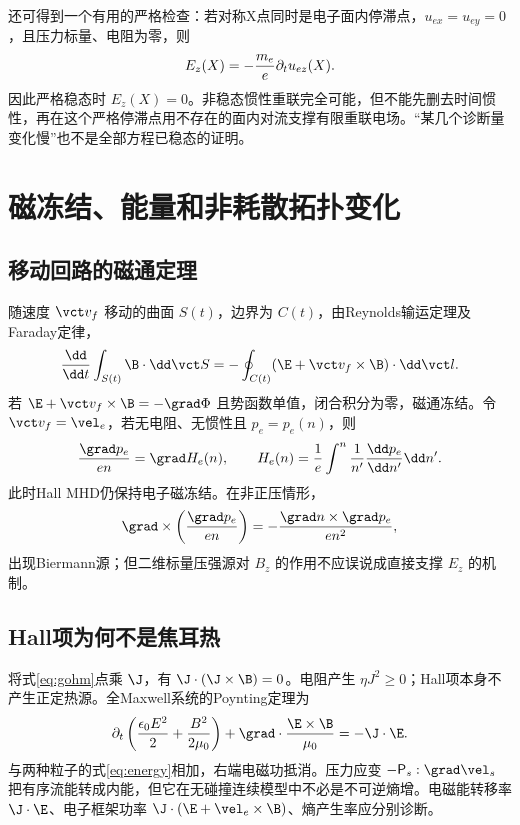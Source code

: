 还可得到一个有用的严格检查：若对称X点同时是电子面内停滞点，$u_{ex}=u_{ey}=0$，且压力标量、电阻为零，则
\begin{equation}E_z(X)=-{m_e\over e}\partial_tu_{ez}(X).
\end{equation}
因此严格稳态时 $E_z(X)=0$。非稳态惯性重联完全可能，但不能先删去时间惯性，再在这个严格停滞点用不存在的面内对流支撑有限重联电场。“某几个诊断量变化慢”也不是全部方程已稳态的证明。

\section{磁冻结、能量和非耗散拓扑变化}
\subsection{移动回路的磁通定理}
随速度 $\vct v_f$ 移动的曲面 $S(t)$，边界为 $C(t)$，由Reynolds输运定理及Faraday定律，
\begin{equation}{\dd\over\dd t}\int_{S(t)}\B\cdot\dd\vct S=-\oint_{C(t)}(\E+\vct v_f\times\B)\cdot\dd\vct l.\label{eq:flux}\end{equation}
若 $\E+\vct v_f\times\B=-\grad\Phi$ 且势函数单值，闭合积分为零，磁通冻结。令 $\vct v_f=\vel_e$，若无电阻、无惯性且 $p_e=p_e(n)$，则
\begin{equation}{\grad p_e\over en}=\grad H_e(n),\qquad H_e(n)={1\over e}\int^n{1\over n'}{\dd p_e\over\dd n'}\dd n'.
\end{equation}
此时Hall MHD仍保持电子磁冻结。在非正压情形，
\begin{equation}\grad\times\left({\grad p_e\over en}\right)=-{\grad n\times\grad p_e\over en^2},
\end{equation}
出现Biermann源；但二维标量压强源对 $B_z$ 的作用不应误说成直接支撑 $E_z$ 的机制。

\subsection{Hall项为何不是焦耳热}
将式\eqref{eq:gohm}点乘 $\J$，有 $\J\cdot(\J\times\B)=0$。电阻产生 $\eta J^2\ge0$；Hall项本身不产生正定热源。全Maxwell系统的Poynting定理为
\begin{equation}\partial_t\left({\epsilon_0E^2\over2}+{B^2\over2\mu_0}\right)+\grad\cdot{\E\times\B\over\mu_0}=-\J\cdot\E.
\end{equation}
与两种粒子的式\eqref{eq:energy}相加，右端电磁功抵消。压力应变 $-\mathsf P_s:\grad\vel_s$ 把有序流能转成内能，但它在无碰撞连续模型中不必是不可逆熵增。电磁能转移率 $\J\cdot\E$、电子框架功率 $\J\cdot(\E+\vel_e\times\B)$、熵产生率应分别诊断。

